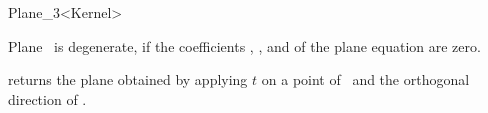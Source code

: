 \begin{ccRefClass} {Plane_3<Kernel>}
       {}
\ccGlue
{}
       {}

       {Plane \ccVar\ is degenerate, if the coefficients ,  
        , and  of the plane equation are zero.}


       {returns the plane obtained by applying $t$ on a point of \ccVar\ 
        and the orthogonal direction of \ccVar.}

\ccSeeAlso
{}

\end{ccRefClass} 
